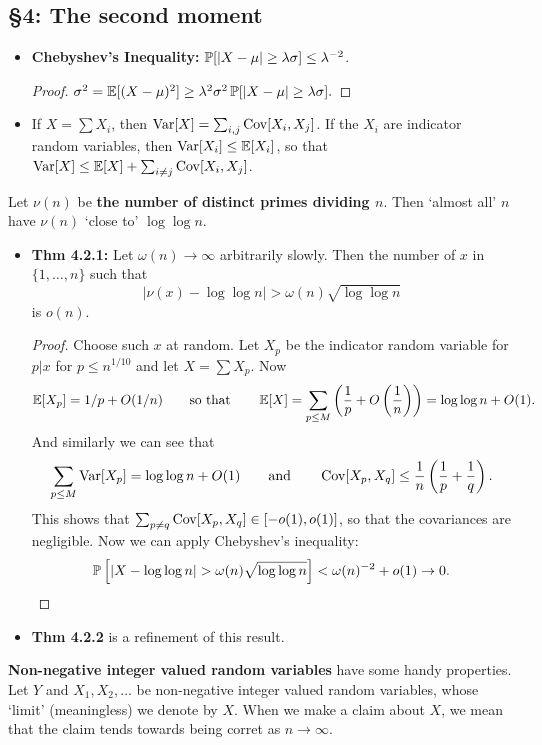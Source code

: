 \documentclass[11pt]{article}
\newenvironment{INT}[1][]{\begin{itemize}\small\item\textbf{#1}}{\end{itemize}}
\newcommand{\moreINT}[1][]{\item\textbf{#1}}
\begin{document}
\begin{chapter4}
\section*{\S4: The second moment}
\begin{itemise}
\item \begin{INT}[Chebyshev's Inequality:]
$\operatorname{\mathbb{P}}[|X-\mu|\geq\lambda\sigma]\leq\lambda^{-2}$.
\begin{proof}
$\sigma^2=\operatorname{\mathbb{E}}[(X-\mu)^2]\geq\lambda^2\sigma^2\operatorname{\mathbb{P}}[|X-\mu|\geq\lambda\sigma].$
\end{proof}
\item If $X=\sum X_i$, then $\operatorname{Var}[X]=\sum_{i,j}\operatorname{Cov}[X_i,X_j]$. If the $X_i$ are indicator random variables, then $\operatorname{Var}[X_i]\leq\operatorname{\mathbb{E}}[X_i]$, so that $\operatorname{Var}[X]\leq\operatorname{\mathbb{E}}[X]+\sum_{i\neq j}\operatorname{Cov}[X_i,X_j]$.
\end{INT}
\item Let $\nu(n)$ be \textbf{the number of distinct primes dividing $n$}. Then `almost all' $n$ have $\nu(n)$ `close to' $\log\log n$.
\begin{INT}[Thm 4.2.1:] Let $\omega(n)\rightarrow\infty$ arbitrarily slowly. Then the number of $x$ in $\{1,\ldots,n\}$ such that
\[|\nu(x)-\log\log n|>\omega(n)\sqrt{\log\log n}\]
is $o(n)$.
\begin{proof}
Choose such $x$ at random. Let $X_p$ be the indicator random variable for $p|x$ for $p\leq n^{1/10}$ and let $X=\sum X_p$. Now
\[\operatorname{\mathbb{E}}[X_p]=1/p+O(1/n)\textup{\qquad so that\qquad}\operatorname{\mathbb{E}}[X]=\sum_{p\leq M}\left(\frac{1}{p}+O\left(\frac{1}{n}\right)\right)=\log\log n+O(1).\]
And similarly we can see that
\[\sum_{p\leq M}\operatorname{Var}[X_p]=\log\log n+O(1)\textup{\qquad and\qquad}\operatorname{Cov}[X_p,X_q]\leq\frac{1}{n}\left(\frac{1}{p}+\frac{1}{q}\right).\]
This shows that $\sum_{p\neq q}\operatorname{Cov}[X_p,X_q]\in[-o(1),o(1)]$, so that the covariances are negligible. Now we can apply Chebyshev's inequality:
\[\Prob\left[|X-\log\log n|>\omega(n)\sqrt{\log\log n}\right]<\omega(n)^{-2}+o(1)\rightarrow0.\qedhere\]
\end{proof}
\moreINT[Thm 4.2.2] is a refinement of this result.
\end{INT}
\item \textbf{Non-negative integer valued random variables} have some handy properties. Let $Y$ and $X_1,X_2,\ldots$ be non-negative integer valued random variables, whose `limit' (meaningless) we denote by $X$. When we make a claim about $X$, we mean that the claim tends towards being corret as $n\rightarrow \infty$.

\end{itemise}
\end{chapter4}
\end{document}
